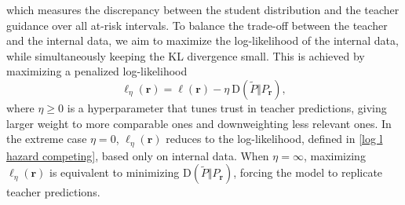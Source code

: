 \documentclass{article}
\theoremstyle{plain}
\theoremstyle{definition}
\theoremstyle{remark}
\begin{document}
which measures the discrepancy between the student distribution and the teacher guidance over all at-risk intervals. To balance the trade-off between the teacher and the internal data, we aim to maximize the log-likelihood of the internal data, while simultaneously keeping the KL divergence small. This is achieved by maximizing a penalized log-likelihood
\begin{equation}
  \ell_{\eta}(\boldsymbol{r})
= \ell(\boldsymbol{r})- \eta~ \mbox{D}(\tilde{P} \Vert  P_{\boldsymbol{r}}),
\label{eq:penalized-loglik0}  
\end{equation}
where $\eta \geq 0$ is a hyperparameter that tunes trust in teacher predictions, giving larger weight to more comparable ones and downweighting less relevant ones.  
In the extreme case $\eta = 0$, $\ell_{\eta}(\boldsymbol{r})$ reduces to the log-likelihood, defined in \eqref{log l hazard competing}, based only on internal data. When $\eta = \infty$, maximizing $\ell_{\eta}(\boldsymbol{r})$ is equivalent to minimizing $\mbox{D}(\tilde{P} \Vert  P_{\boldsymbol{r}})$, forcing the model to replicate teacher predictions. 
\end{document}
